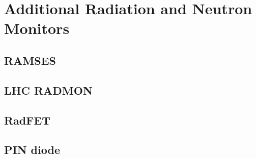 \chapter{Additional Radiation and Neutron Monitors}

\section{RAMSES}

\section{LHC RADMON}

\section{RadFET}

\section{PIN diode}